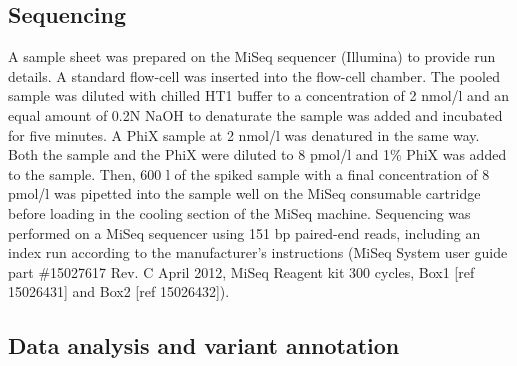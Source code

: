 \subsection{Sequencing}
A sample sheet was prepared on the MiSeq sequencer (Illumina) to provide run details. 
A standard flow-cell was inserted into the flow-cell chamber. 
The pooled sample was diluted with chilled HT1 buffer to a concentration of 2 nmol/l and an equal amount of 0.2N NaOH to denaturate the sample was added and incubated for five minutes. 
A PhiX sample at 2 nmol/l was denatured in the same way. 
Both the sample and the PhiX were diluted to 8 pmol/l and 1\% PhiX was added to the sample. 
Then, 600 {\textmu}l of the spiked sample with a final concentration of 8 pmol/l was pipetted into the sample well on the MiSeq consumable cartridge before loading in the cooling section of the MiSeq machine. 
Sequencing was performed on a MiSeq sequencer using 151 bp paired-end reads, including an index run according to the manufacturer’s instructions (MiSeq System user guide part \#15027617 Rev. C April 2012, MiSeq Reagent kit 300 cycles, Box1 [ref 15026431] and Box2 [ref 15026432]).

\subsection{Data analysis and variant annotation}

